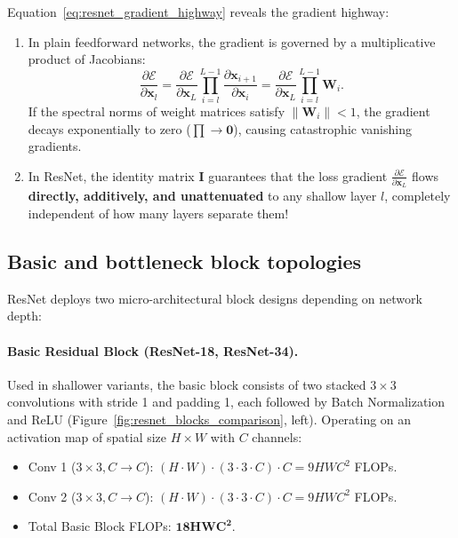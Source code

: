Equation~\eqref{eq:resnet_gradient_highway} reveals the gradient highway:
\begin{enumerate}[leftmargin=*]
  \item In plain feedforward networks, the gradient is governed by a multiplicative product of Jacobians:
    \begin{equation}
    \frac{\partial \mathcal{E}}{\partial \mathbf{x}_l} = \frac{\partial \mathcal{E}}{\partial \mathbf{x}_L} \prod_{i=l}^{L-1} \frac{\partial \mathbf{x}_{i+1}}{\partial \mathbf{x}_i} = \frac{\partial \mathcal{E}}{\partial \mathbf{x}_L} \prod_{i=l}^{L-1} \mathbf{W}_i.
    \end{equation}
    If the spectral norms of weight matrices satisfy $\|\mathbf{W}_i\| < 1$, the gradient decays exponentially to zero ($\prod \to \mathbf{0}$), causing catastrophic vanishing gradients.
  \item In ResNet, the identity matrix $\mathbf{I}$ guarantees that the loss gradient $\frac{\partial \mathcal{E}}{\partial \mathbf{x}_L}$ flows \textbf{directly, additively, and unattenuated} to any shallow layer $l$, completely independent of how many layers separate them!
\end{enumerate}

\subsection{Basic and bottleneck block topologies}
\label{sec:resnet_block_topologies}

ResNet deploys two micro-architectural block designs depending on network depth:

\paragraph{Basic Residual Block (ResNet-18, ResNet-34).}
Used in shallower variants, the basic block consists of two stacked $3 \times 3$ convolutions with stride 1 and padding 1, each followed by Batch Normalization and ReLU (Figure~\ref{fig:resnet_blocks_comparison}, left). Operating on an activation map of spatial size $H \times W$ with $C$ channels:
\begin{itemize}[noitemsep]
  \item Conv 1 ($3 \times 3, C \to C$): $(H \cdot W) \cdot (3 \cdot 3 \cdot C) \cdot C = 9 H W C^2$ FLOPs.
  \item Conv 2 ($3 \times 3, C \to C$): $(H \cdot W) \cdot (3 \cdot 3 \cdot C) \cdot C = 9 H W C^2$ FLOPs.
  \item Total Basic Block FLOPs: $\mathbf{18 H W C^2}$.
\end{itemize}

